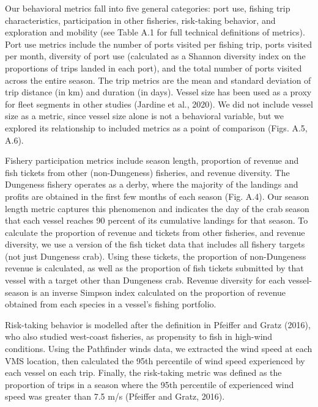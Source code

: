 \documentclass[]{elsarticle} %
\begin{document}
Our behavioral metrics fall into five general categories: port use,
fishing trip characteristics, participation in other fisheries,
risk-taking behavior, and exploration and mobility (see Table A.1 for
full technical definitions of metrics). Port use metrics include the
number of ports visited per fishing trip, ports visited per month,
diversity of port use (calculated as a Shannon diversity index on the
proportions of trips landed in each port), and the total number of ports
visited across the entire season. The trip metrics are the mean and
standard deviation of trip distance (in km) and duration (in days).
Vessel size has been used as a proxy for fleet segments in other studies
(Jardine et al., 2020). We did not include vessel size as a metric,
since vessel size alone is not a behavioral variable, but we explored
its relationship to included metrics as a point of comparison (Figs.
A.5, A.6).

Fishery participation metrics include season length, proportion of
revenue and fish tickets from other (non-Dungeness) fisheries, and
revenue diversity. The Dungeness fishery operates as a derby, where the
majority of the landings and profits are obtained in the first few
months of each season (Fig. A.4). Our season length metric captures this
phenomenon and indicates the day of the crab season that each vessel
reaches 90 percent of its cumulative landings for that season. To
calculate the proportion of revenue and tickets from other fisheries,
and revenue diversity, we use a version of the fish ticket data that
includes all fishery targets (not just Dungeness crab). Using these
tickets, the proportion of non-Dungeness revenue is calculated, as well
as the proportion of fish tickets submitted by that vessel with a target
other than Dungeness crab. Revenue diversity for each vessel-season is
an inverse Simpson index calculated on the proportion of revenue
obtained from each species in a vessel's fishing portfolio.

Risk-taking behavior is modelled after the definition in Pfeiffer and
Gratz (2016), who also studied west-coast fisheries, as propensity to
fish in high-wind conditions. Using the Pathfinder winds data, we
extracted the wind speed at each VMS location, then calculated the 95th
percentile of wind speed experienced by each vessel on each trip.
Finally, the risk-taking metric was defined as the proportion of trips
in a season where the 95th percentile of experienced wind speed was
greater than 7.5 m/s (Pfeiffer and Gratz, 2016).
\end{document}
